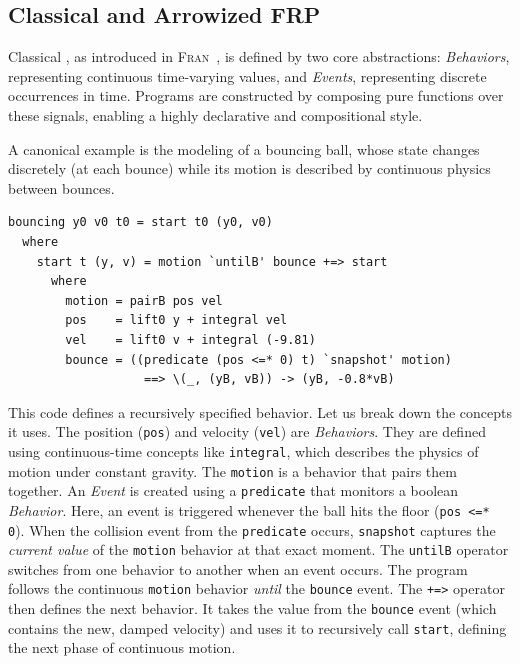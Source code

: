 \subsection{Classical and Arrowized FRP}
\label{sec:sota:frp:classical}

Classical \frp, as introduced in \textsc{Fran}~\cite{DBLP:conf/icfp/ElliottH97}, is defined by two
core abstractions: \emph{Behaviors}, representing continuous time-varying values, and \emph{Events},
representing discrete occurrences in time. Programs are constructed by composing pure functions over
these signals, enabling a highly declarative and compositional style.

A canonical example is the modeling of a bouncing ball, whose state changes discretely (at each
bounce) while its motion is described by continuous physics between bounces.

\begin{lstlisting}[basicstyle=\ttfamily\footnotesize\color{BlackText}]
bouncing y0 v0 t0 = start t0 (y0, v0)
  where
    start t (y, v) = motion `untilB' bounce +=> start
      where
        motion = pairB pos vel
        pos    = lift0 y + integral vel
        vel    = lift0 v + integral (-9.81)
        bounce = ((predicate (pos <=* 0) t) `snapshot' motion)
                   ==> \(_, (yB, vB)) -> (yB, -0.8*vB)
\end{lstlisting}

This code defines a recursively specified behavior. Let us break down the \frp concepts it uses.
The position (\texttt{pos}) and velocity (\texttt{vel}) are \emph{Behaviors}. They are defined using
continuous-time concepts like \texttt{integral}, which describes the physics of motion under
constant gravity. The \texttt{motion} is a behavior that pairs them together. An \emph{Event} is
created using a \texttt{predicate} that monitors a boolean \emph{Behavior}. Here, an event is
triggered whenever the ball hits the floor (\texttt{pos <=* 0}). When the collision event from the
\texttt{predicate} occurs, \texttt{snapshot} captures the \emph{current value} of the
\texttt{motion} behavior at that exact moment. The \texttt{untilB} operator switches from one
behavior to another when an event occurs. The program follows the continuous \texttt{motion}
behavior \emph{until} the \texttt{bounce} event. The \texttt{+=>} operator then defines the next
behavior. It takes the value from the \texttt{bounce} event (which contains the new, damped
velocity) and uses it to recursively call \texttt{start}, defining the next phase of continuous
motion.

